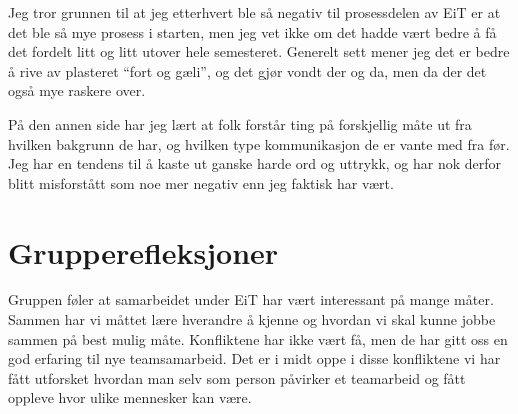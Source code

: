 Jeg tror grunnen til at jeg etterhvert ble så negativ til prosessdelen av EiT 
er at det ble så mye prosess i starten, men jeg vet ikke om det hadde vært bedre å få 
det fordelt litt og litt utover hele semesteret. Generelt sett mener jeg det er 
bedre å rive av plasteret ``fort og gæli'', og det gjør vondt der og da, men 
da der det også mye raskere over. 

På den annen side har jeg lært at folk forstår ting på forskjellig måte ut fra 
hvilken bakgrunn de har, og hvilken type kommunikasjon de er vante med fra før.
Jeg har en tendens til å kaste ut ganske harde ord og uttrykk, og har nok 
derfor blitt misforstått som noe mer negativ enn jeg faktisk har vært. 

\section{Grupperefleksjoner}

Gruppen føler at samarbeidet under EiT har vært interessant på mange måter. Sammen har vi måttet lære
hverandre å kjenne og hvordan vi skal kunne jobbe sammen på best mulig måte. Konfliktene har ikke vært få,
men de har gitt oss en god erfaring til nye teamsamarbeid. Det er i midt oppe i disse konfliktene vi har fått
utforsket hvordan man selv som person påvirker et teamarbeid og fått oppleve hvor ulike mennesker kan være. 

